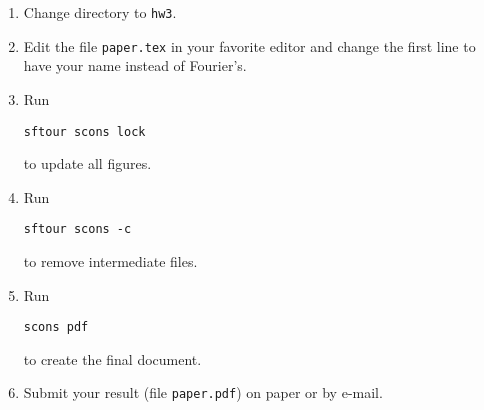 \begin{enumerate}
\item Change directory to \texttt{hw3}.
\item Edit the file \texttt{paper.tex} in your favorite editor and change the
  first line to have your name instead of Fourier's.
\item Run
\begin{verbatim}
sftour scons lock
\end{verbatim}
to update all figures.
\item Run
\begin{verbatim}
sftour scons -c
\end{verbatim}
to remove intermediate files.
\item Run
\begin{verbatim}
scons pdf
\end{verbatim}
to create the final document.
\item Submit your result (file \texttt{paper.pdf}) on paper or by
e-mail.
\end{enumerate}



